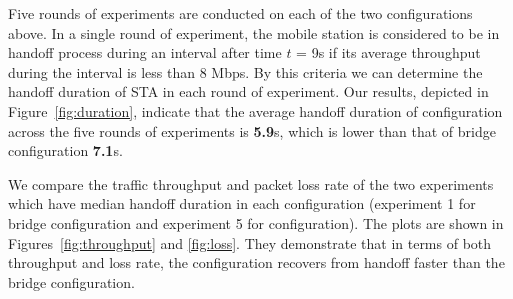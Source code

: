 % 

Five rounds of experiments are conducted on each of the two configurations
above. In a single round of experiment, the mobile station is considered to be
in handoff process during an interval after time $t$ = 9s if its average
throughput during the interval is less than 8 Mbps. By this criteria we can
determine the handoff duration of STA in each round of experiment. Our results, depicted  in Figure~\ref{fig:duration}, indicate that the average handoff
duration of \aetherflow configuration across the five rounds of experiments is
\textbf{5.9}s, which is lower than that of bridge configuration \textbf{7.1}s.

We compare the traffic throughput and packet loss rate of the two experiments
which have median handoff duration in each configuration (experiment 1 for
bridge configuration and experiment 5 for \aetherflow configuration). 
The plots are shown in Figures~\ref{fig:throughput} and \ref{fig:loss}.
They demonstrate that in terms of both throughput and loss rate, the \aetherflow
configuration recovers from handoff faster than the bridge configuration. 

